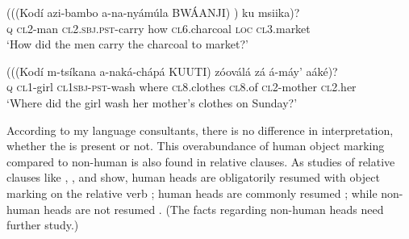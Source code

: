 \documentclass[output=paper]{LSP/langsci}
\begin{document}
\begin{exe}
\ex
\label{02-do-ex:22}%
\begin{xlist}

\ex 
\gll (((Kodí 	azi-bambo 		a-na-nyámúla 		BWÁANJI)	 ) 		ku msiika)?\\
	 \textsc{q}		\textsc{cl2}-man			\textsc{cl2.sbj.pst}-carry	how			\textsc{cl6}.charcoal	\textsc{loc} \textsc{cl3}.market\\
\glt ‘How did the men carry the charcoal to market?’

\ex 
\gll (((Kodí 	m-tsíkana 	a-naká-chápá 		KUUTI) 	zóoválá 		zá 	 		á-máy’ 		aáké)?\\
	 \textsc{q}		\textsc{cl1}-girl		\textsc{cl1sbj}-\textsc{pst}-wash	where		\textsc{cl8}.clothes 	\textsc{cl8}.of	\textsc{cl2}-mother	\textsc{cl2}.her\\
\glt ‘Where did the girl wash her mother’s clothes on Sunday?’
\end{xlist}
\end{exe}

According to my language consultants, there is no difference in interpretation, whether the  is present or not.
This overabundance of human object marking compared to non-human is also found in relative clauses. 
As studies of  relative clauses like \citet{Downingetal2011Prosodic}, \citet{Henderson2006Syntax},
 and \citet{Mchombo2004Syntax} show, human  heads are obligatorily resumed with object marking on the relative verb ; human  heads are commonly resumed ; while non-human  heads are not resumed . 
(The facts regarding non-human  heads need further study.)
\end{document}
